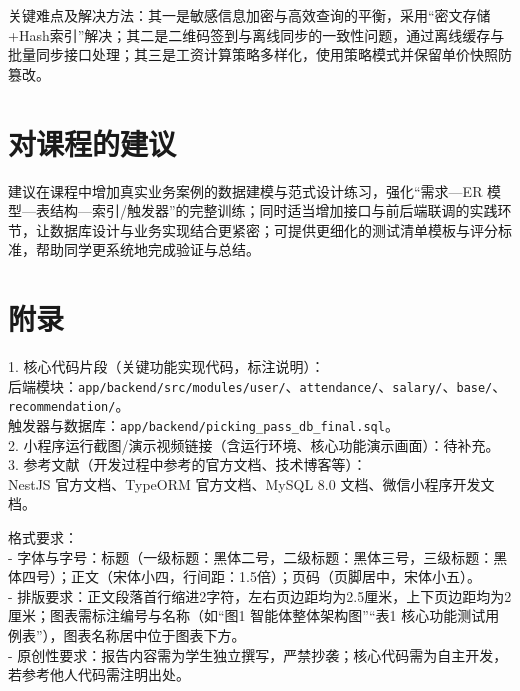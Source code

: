 \documentclass[UTF8,a4paper,fontset=none]{ctexart}
\begin{document}
关键难点及解决方法：其一是敏感信息加密与高效查询的平衡，采用“密文存储+Hash索引”解决；其二是二维码签到与离线同步的一致性问题，通过离线缓存与批量同步接口处理；其三是工资计算策略多样化，使用策略模式并保留单价快照防篡改。

\section{对课程的建议}
建议在课程中增加真实业务案例的数据建模与范式设计练习，强化“需求—ER 模型—表结构—索引/触发器”的完整训练；同时适当增加接口与前后端联调的实践环节，让数据库设计与业务实现结合更紧密；可提供更细化的测试清单模板与评分标准，帮助同学更系统地完成验证与总结。

\section{附录}
1. 核心代码片段（关键功能实现代码，标注说明）：\\
\quad 后端模块：\texttt{app/backend/src/modules/user/}、\texttt{attendance/}、\texttt{salary/}、\texttt{base/}、\texttt{recommendation/}。\\
\quad 触发器与数据库：\texttt{app/backend/picking\_pass\_db\_final.sql}。\\
2. 小程序运行截图/演示视频链接（含运行环境、核心功能演示画面）：待补充。\\
3. 参考文献（开发过程中参考的官方文档、技术博客等）：\\
\quad NestJS 官方文档、TypeORM 官方文档、MySQL 8.0 文档、微信小程序开发文档。

\vspace{1em}

格式要求：\\
- 字体与字号：标题（一级标题：黑体二号，二级标题：黑体三号，三级标题：黑体四号）；正文（宋体小四，行间距：1.5倍）；页码（页脚居中，宋体小五）。\\
- 排版要求：正文段落首行缩进2字符，左右页边距均为2.5厘米，上下页边距均为2厘米；图表需标注编号与名称（如“图1 智能体整体架构图”“表1 核心功能测试用例表”），图表名称居中位于图表下方。\\
- 原创性要求：报告内容需为学生独立撰写，严禁抄袭；核心代码需为自主开发，若参考他人代码需注明出处。
\end{document}
